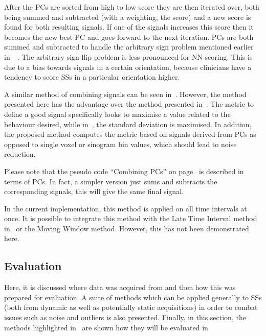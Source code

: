                     After the \glspl{PC} are sorted from high to low score they are then iterated over, both being summed and subtracted (with a weighting, the score) and a new score is found for both resulting signals. If one of the signals increases this score then it becomes the new best \gls{PC} and goes forward to the next iteration. \glspl{PC} are both summed and subtracted to handle the arbitrary sign problem mentioned earlier in~~\parencite{Bertolli2017}. The arbitrary sign flip problem is less pronounced for \gls{NN} scoring. This is due to a bias towards signals in a certain orientation, because clinicians have a tendency to score \glspl{SS} in a particular orientation higher.
                    
                    A similar method of combining signals can be seen in~\parencite{Kesner2010AMethods}. However, the method presented here has the advantage over the method presented in~\parencite{Kesner2010AMethods}. The metric to define a good signal specifically looks to maximise a value related to the behaviour desired, while in~\parencite{Kesner2010AMethods}, the standard deviation is maximised. In addition, the proposed method computes the metric based on signals derived from \glspl{PC} as opposed to single voxel or sinogram bin values, which should lead to noise reduction.
                    
                    Please note that the pseudo code ``Combining \glspl{PC}'' on page~\pageref{alg:pca_data_driven_surrogate_signal_extraction_methods_for_dynamic_pet_methods_score_select_and_combine_method_combine_combine_pseudo_code} is described in terms of \glspl{PC}. In fact, a simpler version just sums and subtracts the corresponding signals, this will give the same final signal. 
                
                    In the current implementation, this method is applied on all time intervals at once. It is possible to integrate this method with the Late Time Interval method in~ or the Moving Window method. However, this has not been demonstrated here.
                    
        \subsection{Evaluation} \label{sec:pca_data_driven_surrogate_signal_extraction_methods_for_dynamic_pet_evaluation}
            Here, it is discussed where data was acquired from and then how this was prepared for evaluation. A suite of methods which can be applied generally to \glspl{SS} (both from dynamic as well as potentially static acquisitions) in order to combat issues such as noise and outliers is also presented. Finally, in this section, the methods highlighted in~ are shown how they will be evaluated in~

